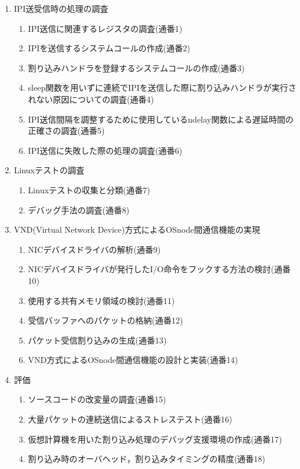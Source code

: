 \documentclass[12pt]{jsarticle}
\begin{document}
\begin{enumerate}
\item IPI送受信時の処理の調査
\begin{enumerate}
\item IPI送信に関連するレジスタの調査(通番1) 
\item IPIを送信するシステムコールの作成(通番2)
\item 割り込みハンドラを登録するシステムコールの作成(通番3)
\item sleep関数を用いずに連続でIPIを送信した際に割り込みハンドラが実行されない原因についての調査(通番4)
\item IPI送信間隔を調整するために使用しているndelay関数による遅延時間の正確さの調査(通番5)
\item IPI送信に失敗した際の処理の調査(通番6)
\end{enumerate}

\item Linuxテストの調査
\begin{enumerate}
\item Linuxテストの収集と分類(通番7)
\item デバッグ手法の調査(通番8)
\end{enumerate}

\item VND(Virtual Network Device)方式によるOSnode間通信機能の実現
\begin{enumerate}
\item NICデバイスドライバの解析(通番9)
\item NICデバイスドライバが発行したI/O命令をフックする方法の検討(通番10)
\item 使用する共有メモリ領域の検討(通番11)
\item 受信バッファへのパケットの格納(通番12)
\item パケット受信割り込みの生成(通番13)
\item VND方式によるOSnode間通信機能の設計と実装(通番14)
\end{enumerate}

\item 評価
\begin{enumerate}
\item ソースコードの改変量の調査(通番15)
\item 大量パケットの連続送信によるストレステスト(通番16)
\item 仮想計算機を用いた割り込み処理のデバッグ支援環境の作成(通番17)
\item 割り込み時のオーバヘッド，割り込みタイミングの精度(通番18)
\end{enumerate}

\end{enumerate}
\end{document}
